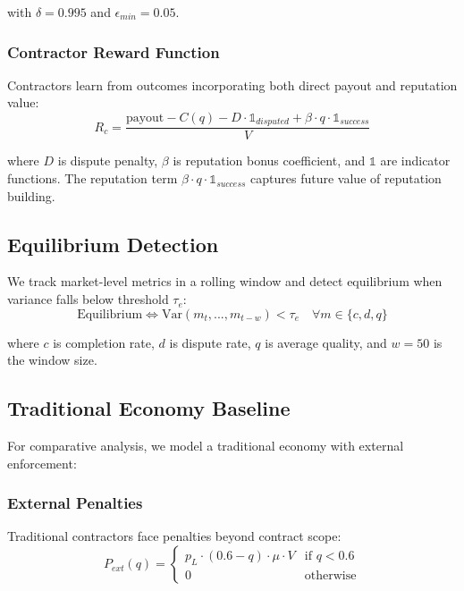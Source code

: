 \documentclass[11pt,a4paper]{article}
\begin{document}
with $\delta = 0.995$ and $\epsilon_{min} = 0.05$.

\subsubsection{Contractor Reward Function}

Contractors learn from outcomes incorporating both direct payout and reputation value:
\begin{equation}
    R_c = \frac{\text{payout} - C(q) - D \cdot \mathbb{1}_{disputed} + \beta \cdot q \cdot \mathbb{1}_{success}}{V}
\end{equation}

where $D$ is dispute penalty, $\beta$ is reputation bonus coefficient, and $\mathbb{1}$ are indicator functions. The reputation term $\beta \cdot q \cdot \mathbb{1}_{success}$ captures future value of reputation building.

\subsection{Equilibrium Detection}

We track market-level metrics in a rolling window and detect equilibrium when variance falls below threshold $\tau_e$:
\begin{equation}
    \text{Equilibrium} \iff \text{Var}(m_t, ..., m_{t-w}) < \tau_e \quad \forall m \in \{c, d, q\}
\end{equation}

where $c$ is completion rate, $d$ is dispute rate, $q$ is average quality, and $w = 50$ is the window size.

\subsection{Traditional Economy Baseline}

For comparative analysis, we model a traditional economy with external enforcement:

\subsubsection{External Penalties}

Traditional contractors face penalties beyond contract scope:
\begin{equation}
    P_{ext}(q) = \begin{cases}
        p_L \cdot (0.6 - q) \cdot \mu \cdot V & \text{if } q < 0.6 \\
        0 & \text{otherwise}
    \end{cases}
\end{equation}
\end{document}
